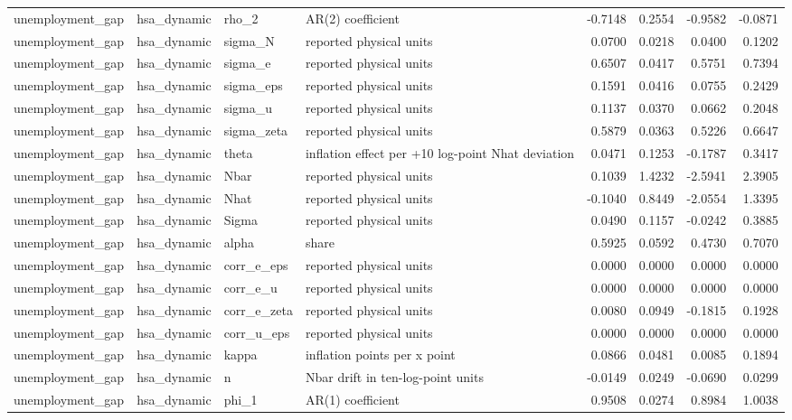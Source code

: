 \begin{tabular}{llllrrrr}
unemployment\_gap & hsa\_dynamic & rho\_2 & AR(2) coefficient & -0.7148 & 0.2554 & -0.9582 & -0.0871 \\
unemployment\_gap & hsa\_dynamic & sigma\_N & reported physical units & 0.0700 & 0.0218 & 0.0400 & 0.1202 \\
unemployment\_gap & hsa\_dynamic & sigma\_e & reported physical units & 0.6507 & 0.0417 & 0.5751 & 0.7394 \\
unemployment\_gap & hsa\_dynamic & sigma\_eps & reported physical units & 0.1591 & 0.0416 & 0.0755 & 0.2429 \\
unemployment\_gap & hsa\_dynamic & sigma\_u & reported physical units & 0.1137 & 0.0370 & 0.0662 & 0.2048 \\
unemployment\_gap & hsa\_dynamic & sigma\_zeta & reported physical units & 0.5879 & 0.0363 & 0.5226 & 0.6647 \\
unemployment\_gap & hsa\_dynamic & theta & inflation effect per +10 log-point Nhat deviation & 0.0471 & 0.1253 & -0.1787 & 0.3417 \\
unemployment\_gap & hsa\_dynamic & Nbar & reported physical units & 0.1039 & 1.4232 & -2.5941 & 2.3905 \\
unemployment\_gap & hsa\_dynamic & Nhat & reported physical units & -0.1040 & 0.8449 & -2.0554 & 1.3395 \\
unemployment\_gap & hsa\_dynamic & Sigma & reported physical units & 0.0490 & 0.1157 & -0.0242 & 0.3885 \\
unemployment\_gap & hsa\_dynamic & alpha & share & 0.5925 & 0.0592 & 0.4730 & 0.7070 \\
unemployment\_gap & hsa\_dynamic & corr\_e\_eps & reported physical units & 0.0000 & 0.0000 & 0.0000 & 0.0000 \\
unemployment\_gap & hsa\_dynamic & corr\_e\_u & reported physical units & 0.0000 & 0.0000 & 0.0000 & 0.0000 \\
unemployment\_gap & hsa\_dynamic & corr\_e\_zeta & reported physical units & 0.0080 & 0.0949 & -0.1815 & 0.1928 \\
unemployment\_gap & hsa\_dynamic & corr\_u\_eps & reported physical units & 0.0000 & 0.0000 & 0.0000 & 0.0000 \\
unemployment\_gap & hsa\_dynamic & kappa & inflation points per x point & 0.0866 & 0.0481 & 0.0085 & 0.1894 \\
unemployment\_gap & hsa\_dynamic & n & Nbar drift in ten-log-point units & -0.0149 & 0.0249 & -0.0690 & 0.0299 \\
unemployment\_gap & hsa\_dynamic & phi\_1 & AR(1) coefficient & 0.9508 & 0.0274 & 0.8984 & 1.0038 \\

\end{tabular}
